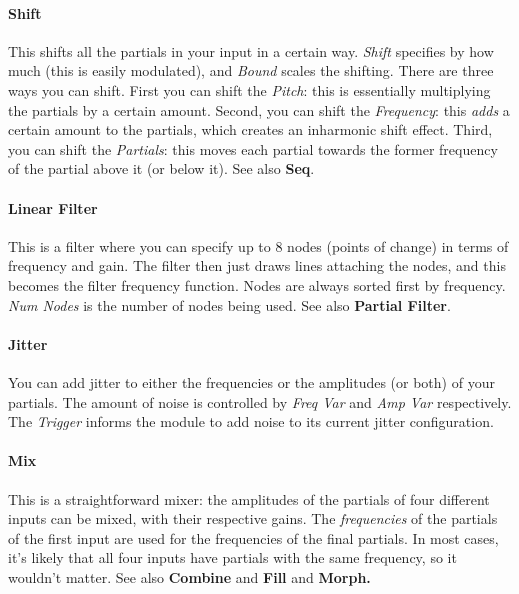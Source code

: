 \documentclass{article}
\begin{document}
\paragraph{Shift} This shifts all the partials in your input in a certain way.  {\it Shift} specifies by how much (this is easily modulated), and {\it Bound} scales the shifting.  There are three ways you can shift.  First you can shift the {\it Pitch}: this is essentially multiplying the partials by a certain amount.  Second, you can shift the {\it Frequency}: this {\it adds} a certain amount to the partials, which creates an inharmonic shift effect.  Third, you can shift the {\it Partials}: this moves each partial towards the former frequency of the partial above it (or below it).  See also {\bf Seq}.

\paragraph{Linear Filter} This is a filter where you can specify up to 8 nodes (points of change) in terms of frequency and gain.  The filter then just draws lines attaching the nodes, and this becomes the filter frequency function.  Nodes are always sorted first by frequency.  {\it Num Nodes} is the number of nodes being used.  See also {\bf Partial Filter}.

\paragraph{Jitter} You can add jitter to either the frequencies or the amplitudes (or both) of your partials.  The amount of noise is controlled by {\it Freq Var} and {\it Amp Var} respectively.  The {\it Trigger} informs the module to add noise to its current jitter configuration.

\paragraph{Mix} This is a straightforward mixer: the amplitudes of the partials of four different inputs can be mixed, with their respective gains.  The {\it frequencies} of the partials of the first input are used for the frequencies of the final partials.  In most cases, it's likely that all four inputs have partials with the same frequency, so it wouldn't matter.  See also {\bf Combine} and {\bf Fill} and {\bf Morph.}
\end{document}
